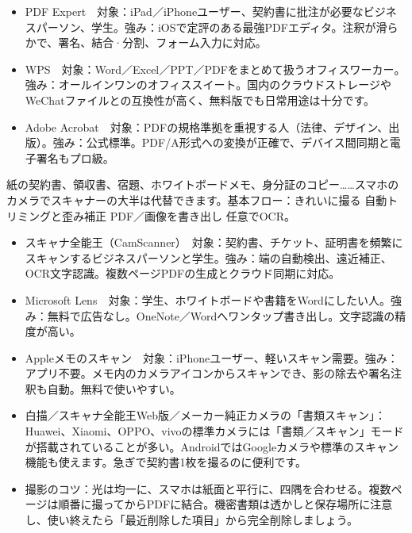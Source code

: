 
\begin{itemize}
  \item PDF Expert　対象：iPad／iPhoneユーザー、契約書に批注が必要なビジネスパーソン、学生。強み：iOSで定評のある最強PDFエディタ。注釈が滑らかで、署名、結合·分割、フォーム入力に対応。
  \item WPS　対象：Word／Excel／PPT／PDFをまとめて扱うオフィスワーカー。強み：オールインワンのオフィススイート。国内のクラウドストレージやWeChatファイルとの互換性が高く、無料版でも日常用途は十分です。
  \item Adobe Acrobat　対象：PDFの規格準拠を重視する人（法律、デザイン、出版）。強み：公式標準。PDF/A形式への変換が正確で、デバイス間同期と電子署名もプロ級。
\end{itemize}


紙の契約書、領収書、宿題、ホワイトボードメモ、身分証のコピー……スマホのカメラでスキャナーの大半は代替できます。基本フロー：きれいに撮る 自動トリミングと歪み補正 PDF／画像を書き出し 任意でOCR。

\begin{itemize}
  \item スキャナ全能王（CamScanner）　対象：契約書、チケット、証明書を頻繁にスキャンするビジネスパーソンと学生。強み：端の自動検出、遠近補正、OCR文字認識。複数ページPDFの生成とクラウド同期に対応。
  \item Microsoft Lens　対象：学生、ホワイトボードや書籍をWordにしたい人。強み：無料で広告なし。OneNote／Wordへワンタップ書き出し。文字認識の精度が高い。
  \item Appleメモのスキャン　対象：iPhoneユーザー、軽いスキャン需要。強み：アプリ不要。メモ内のカメラアイコンからスキャンでき、影の除去や署名注釈も自動。無料で使いやすい。
  \item 白描／スキャナ全能王Web版／メーカー純正カメラの「書類スキャン」：Huawei、Xiaomi、OPPO、vivoの標準カメラには「書類／スキャン」モードが搭載されていることが多い。AndroidではGoogleカメラや標準のスキャン機能も使えます。急ぎで契約書1枚を撮るのに便利です。
  \item 撮影のコツ：光は均一に、スマホは紙面と平行に、四隅を合わせる。複数ページは順番に撮ってからPDFに結合。機密書類は透かしと保存場所に注意し、使い終えたら「最近削除した項目」から完全削除しましょう。
\end{itemize}


